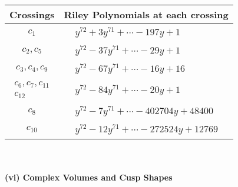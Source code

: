 \documentclass[1p]{elsarticle_modified}
\theoremstyle{definition}
\begin{document}
\begin{tabular}{m{50pt}|m{274pt}}
Crossings & \hspace{64pt}Riley Polynomials at each crossing \\
\hline $$\begin{aligned}c_{1}\end{aligned}$$&$\begin{aligned}
&y^{72}+3 y^{71}+\cdots-197 y+1
\end{aligned}$\\
\hline $$\begin{aligned}c_{2},c_{5}\end{aligned}$$&$\begin{aligned}
&y^{72}-37 y^{71}+\cdots-29 y+1
\end{aligned}$\\
\hline $$\begin{aligned}c_{3},c_{4},c_{9}\end{aligned}$$&$\begin{aligned}
&y^{72}-67 y^{71}+\cdots-16 y+16
\end{aligned}$\\
\hline $$\begin{aligned}c_{6},c_{7},c_{11}\\c_{12}\end{aligned}$$&$\begin{aligned}
&y^{72}-84 y^{71}+\cdots-20 y+1
\end{aligned}$\\
\hline $$\begin{aligned}c_{8}\end{aligned}$$&$\begin{aligned}
&y^{72}-7 y^{71}+\cdots-402704 y+48400
\end{aligned}$\\
\hline $$\begin{aligned}c_{10}\end{aligned}$$&$\begin{aligned}
&y^{72}-12 y^{71}+\cdots-272524 y+12769
\end{aligned}$\\
\hline
\end{tabular}\\~\\
\newpage\flushleft \textbf{(vi) Complex Volumes and Cusp Shapes}
\end{document}
